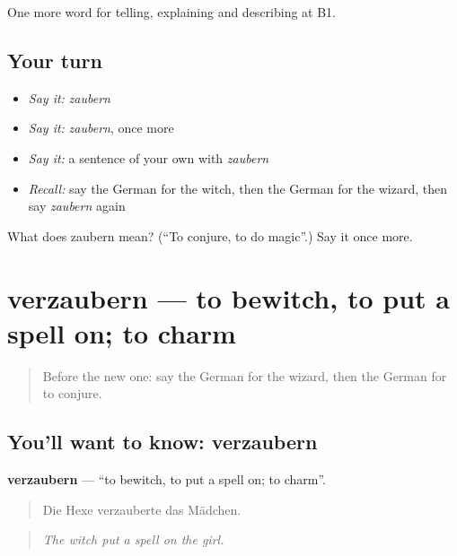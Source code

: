 \begin{grammarlens}[title={What you've built}]
One more word for telling, explaining and describing at B1.
\end{grammarlens}

\subsection*{Your turn}
\begin{itemize}
\raggedright
  \item \emph{Say it:} \emph{zaubern}
  \item \emph{Say it:} \emph{zaubern}, once more
  \item \emph{Say it:} a sentence of your own with \emph{zaubern}
  \item \emph{Recall:} say the German for the witch, then the German for the wizard, then say \emph{zaubern} again
\end{itemize}

\begin{tcolorbox}[breakable,colback=teal!4,colframe=teal!35!black,title={Before you move on}]
What does zaubern mean? (\textquotedblleft{}To conjure, to do magic\textquotedblright{}.) Say it once more.
\end{tcolorbox}
\section[verzaubern]{verzaubern — to bewitch, to put a spell on; to charm}

\label{lesson:GE-C314-verzaubern}



\begin{quote}
Before the new one: say the German for the wizard, then the German for to conjure.
\end{quote}

\subsection*{You'll want to know: verzaubern}
\textbf{verzaubern} — \textquotedblleft{}to bewitch, to put a spell on; to charm\textquotedblright{}.

\begin{quote}
Die Hexe verzauberte das Mädchen.
\end{quote}

\begin{quote}
\emph{The witch put a spell on the girl.}
\end{quote}

